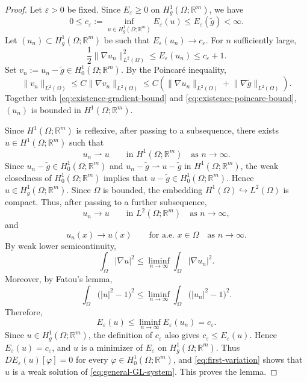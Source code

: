 \documentclass[11pt]{amsart}
\theoremstyle{definition}
\theoremstyle{plain}
\newcommand{\abs}[1]{\lvert#1\rvert}
\newcommand{\norm}[1]{\lVert#1\rVert}
\newcommand{\R}{\mathbb{R}}
\numberwithin{equation}{section}
\begin{document}
\begin{proof}
	Let $\varepsilon>0$ be fixed. Since $E_\varepsilon\geq0$ on
	$H_g^1(\Omega;\R^m)$, we have
	\[
		0
		\leq
		c_\varepsilon
		:=
		\inf_{u\in H_g^1(\Omega;\R^m)}E_\varepsilon(u)
		\leq
		E_\varepsilon(\widetilde g)
		<
		\infty.
	\]
	Let $(u_n)\subset H_g^1(\Omega;\R^m)$ be such that
	$E_\varepsilon(u_n)\to c_\varepsilon$. For $n$ sufficiently large,
	\begin{equation}\label{eq:existence-gradient-bound}
		\frac{1}{2}
		\norm{\nabla u_n}_{L^2(\Omega)}^2
		\leq
		E_\varepsilon(u_n)
		\leq
		c_\varepsilon+1.
	\end{equation}
	Set $v_n:=u_n-\widetilde g\in H_0^1(\Omega;\R^m)$. By the
	Poincar\'e inequality,
	\begin{equation}\label{eq:existence-poincare-bound}
		\norm{v_n}_{L^2(\Omega)}
		\leq
		C\norm{\nabla v_n}_{L^2(\Omega)}
		\leq
		C\left(
		\norm{\nabla u_n}_{L^2(\Omega)}
		+
		\norm{\nabla\widetilde g}_{L^2(\Omega)}
		\right).
	\end{equation}
	Together with \eqref{eq:existence-gradient-bound} and
	\eqref{eq:existence-poincare-bound}, $(u_n)$ is bounded in
	$H^1(\Omega;\R^m)$.

	Since $H^1(\Omega;\R^m)$ is reflexive, after passing to a
	subsequence, there exists $u\in H^1(\Omega;\R^m)$ such that
	\[
		u_n\rightharpoonup u
		\qquad\text{in }H^1(\Omega;\R^m)
		\quad\text{as }n\to\infty.
	\]
Since $u_n-\widetilde g\in H_0^1(\Omega;\R^m)$ and
$u_n-\widetilde g\rightharpoonup u-\widetilde g$ in
$H^1(\Omega;\R^m)$, the weak closedness of $H_0^1(\Omega;\R^m)$ implies
that $u-\widetilde g\in H_0^1(\Omega;\R^m)$. Hence
$u\in H_g^1(\Omega;\R^m)$. Since $\Omega$ is bounded, the embedding
$H^1(\Omega)\hookrightarrow L^2(\Omega)$ is compact. Thus, after
passing to a further subsequence,
	\[
		u_n\to u
		\qquad\text{in }L^2(\Omega;\R^m)
		\quad\text{as }n\to\infty,
	\]
	and
	\[
		u_n(x)\to u(x)
		\qquad\text{for a.e. }x\in\Omega
		\quad\text{as }n\to\infty.
	\]
	By weak lower semicontinuity,
	\[
		\int_\Omega\abs{\nabla u}^2
		\leq
		\liminf_{n\to\infty}
		\int_\Omega\abs{\nabla u_n}^2.
	\]
	Moreover, by Fatou's lemma,
	\[
		\int_\Omega
		\bigl(\abs{u}^2-1\bigr)^2
		\leq
		\liminf_{n\to\infty}
		\int_\Omega
		\bigl(\abs{u_n}^2-1\bigr)^2.
	\]
	Therefore,
	\[
		E_\varepsilon(u)
		\leq
		\liminf_{n\to\infty}E_\varepsilon(u_n)
		=
		c_\varepsilon.
	\]
	Since $u\in H_g^1(\Omega;\R^m)$, the definition of $c_\varepsilon$
	also gives $c_\varepsilon\leq E_\varepsilon(u)$. Hence
	$E_\varepsilon(u)=c_\varepsilon$, and $u$ is a minimizer of
	$E_\varepsilon$ on $H_g^1(\Omega;\R^m)$. Thus
	$DE_\varepsilon(u)[\varphi]=0$ for every
	$\varphi\in H_0^1(\Omega;\R^m)$, and
	\eqref{eq:first-variation} shows that $u$ is a weak solution of
	\eqref{eq:general-GL-system}. This proves the lemma.
\end{proof}
\end{document}
